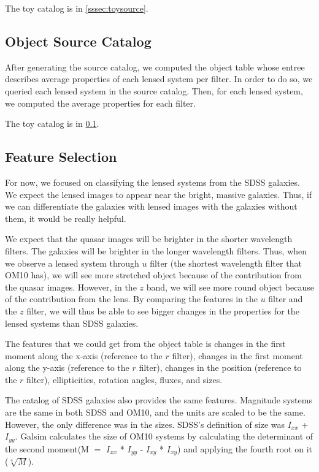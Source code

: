 \documentclass[\docopts]{\docclass}
\begin{document}
The toy catalog is in \ref{sssec:toysource}.

\subsection{Object Source Catalog}
\label{sssec:objectsource}

After generating the source catalog, we computed the object table whose entree describes average properties of each lensed system per filter. In order to do so, we queried each lensed system in the source catalog. Then, for each lensed system, we computed the average properties for each filter.

The toy catalog is in \ref{sssec:objectsource}.

\subsection{Feature Selection}
\label{subsec:feature}

For now, we focused on classifying the lensed systems from the SDSS galaxies. We expect the lensed images to appear near the bright, massive galaxies. Thus, if we can differentiate the galaxies with lensed images with the galaxies without them, it would be really helpful.

We expect that the quasar images will be brighter in the shorter wavelength filters. The galaxies will be brighter in the longer wavelength filters. Thus, when we observe a lensed system through $u$ filter (the shortest wavelength filter that OM10 has), we will see more stretched object because of the contribution from the quasar images. However, in the $z$ band, we will see more round object because of the contribution from the lens. By comparing the features in the $u$ filter and the $z$ filter, we will thus be able to see bigger changes in the properties for the lensed systems than SDSS galaxies.

The features that we could get from the object table is changes in the first moment along the x-axis (reference to the $r$ filter), changes in the first moment along the y-axis (reference to the $r$ filter), changes in the position (reference to the $r$ filter), ellipticities, rotation angles, fluxes, and sizes.

The catalog of SDSS galaxies also provides the same features. Magnitude systems are the same in both SDSS and OM10, and the units are scaled to be the same. However, the only difference was in the sizes. SDSS's definition of size was $I_{xx}$ + $I_{yy}$. Galsim calculates the size of OM10 systems by calculating the determinant of the second moment(M $=$ $I_{xx}$ * $I_{yy}$ - $I_{xy}$ * $I_{xy}$) and applying the fourth root on it ($\sqrt[4]{M}$). 
\end{document}
